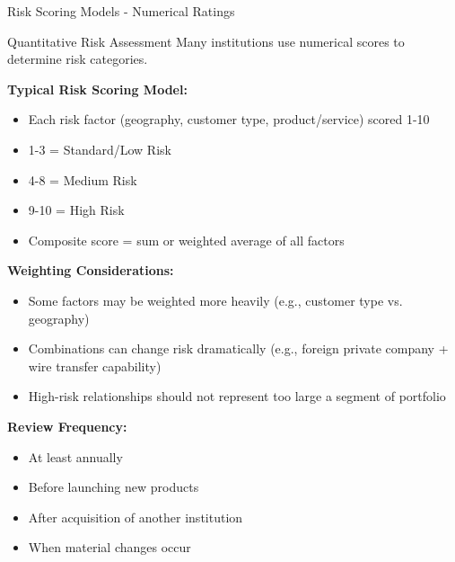 \documentclass[11pt,a4paper]{beamer}
\begin{document}
	\begin{frame}{Risk Scoring Models - Numerical Ratings}
		\begin{block}{Quantitative Risk Assessment}
			Many institutions use numerical scores to determine risk categories.
		\end{block}
		\textbf{Typical Risk Scoring Model:}
		\begin{itemize}
			\item Each risk factor (geography, customer type, product/service) scored 1-10
			\item 1-3 = Standard/Low Risk
			\item 4-8 = Medium Risk
			\item 9-10 = High Risk
			\item Composite score = sum or weighted average of all factors
		\end{itemize}
		\textbf{Weighting Considerations:}
		\begin{itemize}
			\item Some factors may be weighted more heavily (e.g., customer type vs. geography)
			\item Combinations can change risk dramatically (e.g., foreign private company + wire transfer capability)
			\item High-risk relationships should not represent too large a segment of portfolio
		\end{itemize}
		\textbf{Review Frequency:}
		\begin{itemize}
			\item At least annually
			\item Before launching new products
			\item After acquisition of another institution
			\item When material changes occur
		\end{itemize}
	\end{frame}
	
\end{document}
